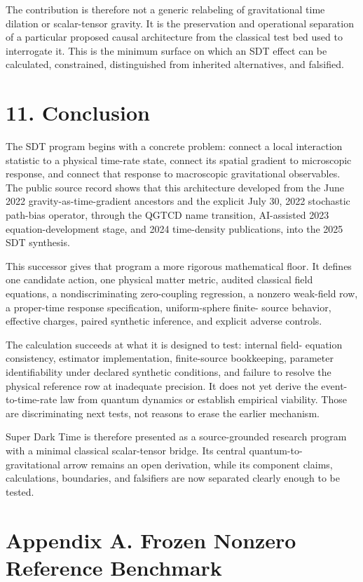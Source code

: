 \documentclass[
  american,
  11pt,
  letterpaper,
]{article}
\begin{document}
The contribution is therefore not a generic relabeling of gravitational time dilation or scalar-tensor gravity. It is the preservation and operational separation of a particular proposed causal architecture from the classical test bed used to interrogate it. This is the minimum surface on which an SDT effect can be calculated, constrained, distinguished from inherited alternatives, and falsified.

\section{11. Conclusion}\label{conclusion}

The SDT program begins with a concrete problem: connect a local interaction statistic to a physical time-rate state, connect its spatial gradient to microscopic response, and connect that response to macroscopic gravitational observables. The public source record shows that this architecture developed from the June 2022 gravity-as-time-gradient ancestors and the explicit July 30, 2022 stochastic path-bias operator, through the QGTCD name transition, AI-assisted 2023 equation-development stage, and 2024 time-density publications, into the 2025 SDT synthesis.

This successor gives that program a more rigorous mathematical floor. It defines one candidate action, one physical matter metric, audited classical field equations, a nondiscriminating zero-coupling regression, a nonzero weak-field row, a proper-time response specification, uniform-sphere finite- source behavior, effective charges, paired synthetic inference, and explicit adverse controls.

The calculation succeeds at what it is designed to test: internal field- equation consistency, estimator implementation, finite-source bookkeeping, parameter identifiability under declared synthetic conditions, and failure to resolve the physical reference row at inadequate precision. It does not yet derive the event-to-time-rate law from quantum dynamics or establish empirical viability. Those are discriminating next tests, not reasons to erase the earlier mechanism.

Super Dark Time is therefore presented as a source-grounded research program with a minimal classical scalar-tensor bridge. Its central quantum-to- gravitational arrow remains an open derivation, while its component claims, calculations, boundaries, and falsifiers are now separated clearly enough to be tested.

\section{Appendix A. Frozen Nonzero Reference Benchmark}\label{appendix-a.-frozen-nonzero-reference-benchmark}
\end{document}
